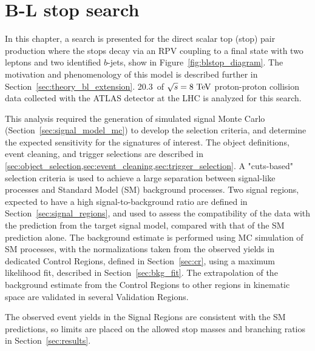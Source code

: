 \chapter[B-L stop search][B-L stop search]{B-L stop search}
\label{ch:bl_stop}

In this chapter, a search is presented for the direct scalar top (stop) pair
production where the stops decay via an RPV coupling to a final state with two
leptons and two identified $b$-jets, show in Figure~\ref{fig:blstop_diagram}.
The motivation and phenomenology of this model is described further in
Section~\ref{sec:theory_bl_extension}.
20.3~\ifb of $\sqrt{s} = 8\TeV$ proton-proton collision data collected with the
ATLAS detector at the LHC is analyzed for this search.

This analysis required the generation of simulated signal Monte Carlo 
(Section~\ref{sec:signal_model_mc}) to develop the selection criteria, and
determine the expected sensitivity for the signatures of interest.
The object definitions, event cleaning, and trigger selections are described in
\cref{sec:object_selection,sec:event_cleaning,sec:trigger_selection}.
A "cuts-based" selection criteria is used to achieve a large separation between
signal-like processes and Standard Model (SM) background processes.
Two signal regions, expected to have a high signal-to-background ratio are
defined in Section~\ref{sec:signal_regions}, and used to assess the
compatibility of the data with the prediction from the target signal model,
compared with that of the SM prediction alone.
The background estimate is performed using MC simulation of SM processes, with
the normalizations taken from the observed yields in dedicated Control Regions,
defined in Section~\ref{sec:cr}, using a maximum likelihood fit, described in
Section~\ref{sec:bkg_fit}.
The extrapolation of the background estimate from the Control Regions to other
regions in kinematic space are validated in several Validation Regions.

The observed event yields in the Signal Regions are consistent with the SM
predictions, so limits are placed on the allowed stop masses and branching
ratios in Section~\ref{sec:results}.


